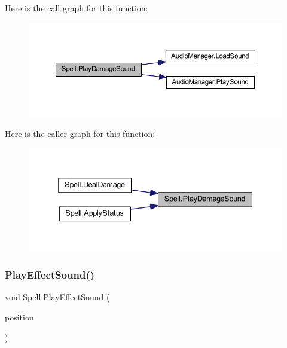 Here is the call graph for this function\+:\nopagebreak
\begin{figure}[H]
\begin{center}
\leavevmode
\includegraphics[width=350pt]{class_spell_a80aa52e9ed4b3555bd04682d93bc5049_cgraph}
\end{center}
\end{figure}
Here is the caller graph for this function\+:\nopagebreak
\begin{figure}[H]
\begin{center}
\leavevmode
\includegraphics[width=338pt]{class_spell_a80aa52e9ed4b3555bd04682d93bc5049_icgraph}
\end{center}
\end{figure}
\mbox{\label{class_spell_a1dfbc90153df551bd995b8b852f808f0}} 
\subsubsection{\texorpdfstring{PlayEffectSound()}{PlayEffectSound()}}
{\footnotesize\ttfamily void Spell.\+Play\+Effect\+Sound (\begin{DoxyParamCaption}\item[{Vector2\+Int}]{position }\end{DoxyParamCaption})}

